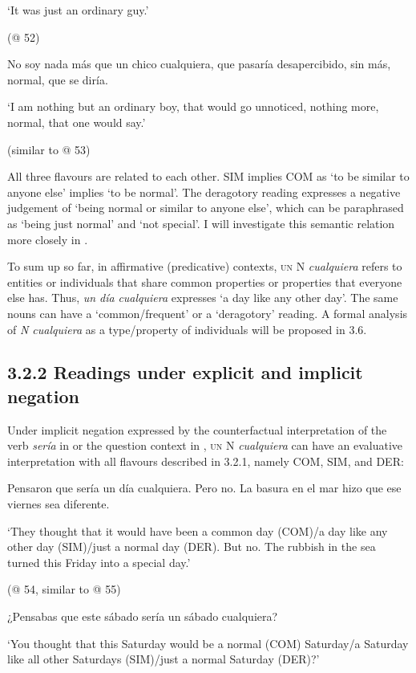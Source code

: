   ‘It was just an ordinary guy.’

  (@ 52)

  No soy nada más que un chico cualquiera, que pasaría desapercibido, sin más, normal, que se diría.

  ‘I am nothing but an ordinary boy, that would go unnoticed, nothing more, normal, that one would say.’ 

  (similar to @ 53)

All three flavours are related to each other. SIM implies COM as ‘to be similar to anyone else’ implies ‘to be normal’. The deragotory reading expresses a negative judgement of ‘being normal or similar to anyone else’, which can be paraphrased as ‘being just normal’ and ‘not special’. I will investigate this semantic relation more closely in .

  To sum up so far, in affirmative (predicative) contexts, \textsc{un} N \textit{cualquiera} refers to entities or individuals that share common properties or properties that everyone else has. Thus, \textit{un día} \textit{cualquiera} expresses ‘a day like any other day’. The same nouns can have a ‘common/frequent’ or a ‘deragotory’ reading. A formal analysis of \textit{N cualquiera} as a type/property of individuals will be proposed in 3.6.

\subsection{\textbf{3.2.2} \textbf{Readings} \textbf{under} \textbf{explicit} \textbf{and} \textbf{implicit} \textbf{negation}}

Under implicit negation expressed by the counterfactual interpretation of the verb \textit{sería} in  or the question context in , \textsc{un} N \textit{cualquiera} can have an evaluative interpretation with all flavours described in 3.2.1, namely COM, SIM, and DER:

\label{bkm:Ref54634548}  Pensaron que sería un día cualquiera. Pero no. La basura en el mar hizo que ese viernes sea diferente.

  ‘They thought that it would have been a common day (COM)/a day like any other day (SIM)/just a normal day (DER). But no. The rubbish in the sea turned this Friday into a special day.’

  (@ 54, similar to @ 55)

\label{bkm:Ref54634539}  ¿Pensabas que este sábado sería un sábado cualquiera?

  ‘You thought that this Saturday would be a normal (COM) Saturday/a Saturday like all other Saturdays (SIM)/just a normal Saturday (DER)?’

